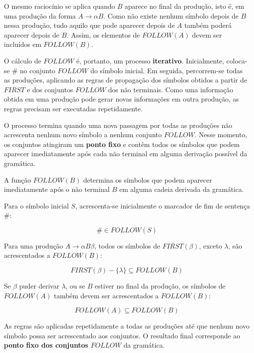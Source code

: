 \documentclass[
  brazilian,
  letterpaper,
]{book}
\theoremstyle{plain}
\theoremstyle{definition}
\theoremstyle{remark}
\begin{document}
O mesmo raciocínio se aplica quando \(B\) aparece no final da produção,
isto é, em uma produção da forma \(A\rightarrow\alpha B\). Como não
existe nenhum símbolo depois de \(B\) nessa produção, tudo aquilo que
pode aparecer depois de \(A\) também poderá aparecer depois de \(B\).
Assim, os elementos de \(FOLLOW(A)\) devem ser incluídos em
\(FOLLOW(B)\).

O cálculo de \(FOLLOW\) é, portanto, um processo \textbf{iterativo}.
Inicialmente, coloca-se \(\#\) no conjunto \(FOLLOW\) do símbolo
inicial. Em seguida, percorrem-se todas as produções, aplicando as
regras de propagação dos símbolos obtidos a partir de \(FIRST\) e dos
conjuntos \(FOLLOW\) dos não terminais. Como uma informação obtida em
uma produção pode gerar novas informações em outra produção, as regras
precisam ser executadas repetidamente.

O processo termina quando uma nova passagem por todas as produções não
acrescenta nenhum novo símbolo a nenhum conjunto \(FOLLOW\). Nesse
momento, os conjuntos atingiram um \textbf{ponto fixo} e contêm todos os
símbolos que podem aparecer imediatamente após cada não terminal em
alguma derivação possível da gramática.

A função \(FOLLOW(B)\) determina os símbolos que podem aparecer
imediatamente após o não terminal \(B\) em alguma cadeia derivada da
gramática.

Para o símbolo inicial \(S\), acrescenta-se inicialmente o marcador de
fim de sentença \(\#\):

\[
\#\in FOLLOW(S)
\]

Para uma produção \(A\rightarrow\alpha B\beta\), todos os símbolos de
\(FIRST(\beta)\), exceto \(\lambda\), são acrescentados a \(FOLLOW(B)\):

\[
FIRST(\beta)-\{\lambda\}\subseteq FOLLOW(B)
\]

Se \(\beta\) puder derivar \(\lambda\), ou se \(B\) estiver no final da
produção, os símbolos de \(FOLLOW(A)\) também devem ser acrescentados a
\(FOLLOW(B)\):

\[
FOLLOW(A)\subseteq FOLLOW(B)
\]

As regras são aplicadas repetidamente a todas as produções até que
nenhum novo símbolo possa ser acrescentado aos conjuntos. O resultado
final corresponde ao \textbf{ponto fixo dos conjuntos \(FOLLOW\)} da
gramática.
\end{document}
